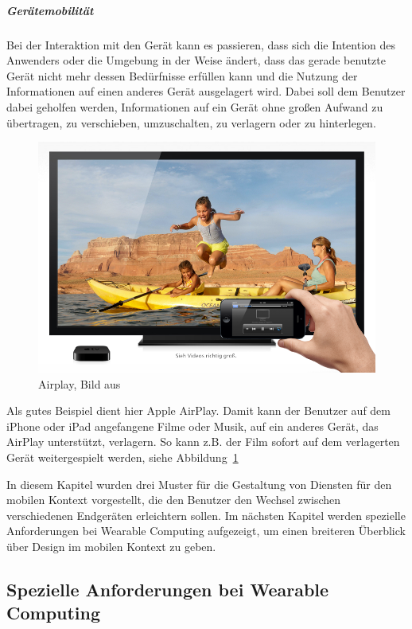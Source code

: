 \subparagraph{Gerätemobilität}

Bei der Interaktion mit den Gerät kann es passieren, dass sich die Intention des Anwenders oder die Umgebung in der Weise ändert, dass das gerade benutzte Gerät nicht mehr dessen Bedürfnisse erfüllen kann und die Nutzung der Informationen auf einen anderes Gerät ausgelagert wird. Dabei soll dem Benutzer dabei geholfen werden, Informationen auf ein Gerät ohne großen Aufwand zu übertragen, zu verschieben, umzuschalten, zu verlagern oder zu hinterlegen.

\begin{figure}[h]
\centering
  \includegraphics[width=1\textwidth]{img/airplay.png}
  \caption{Airplay, Bild aus \cite{airplaySite}}\label{fig:airplay}
	
\end{figure}
Als gutes Beispiel dient hier Apple AirPlay. Damit kann der Benutzer auf dem iPhone oder iPad angefangene Filme oder Musik, auf ein anderes Gerät, das AirPlay unterstützt, verlagern. So kann z.B. der  Film sofort auf dem verlagerten Gerät weitergespielt werden, siehe Abbildung~\ref{fig:airplay}
\newline

In diesem Kapitel wurden drei Muster für die Gestaltung von Diensten für den mobilen Kontext vorgestellt, die den Benutzer den Wechsel zwischen verschiedenen  Endgeräten erleichtern sollen. Im nächsten Kapitel werden spezielle Anforderungen bei Wearable Computing aufgezeigt, um einen breiteren Überblick über Design im mobilen Kontext zu geben.

\subsection{Spezielle Anforderungen bei Wearable Computing} 
\label{sub:wearable_computers}


